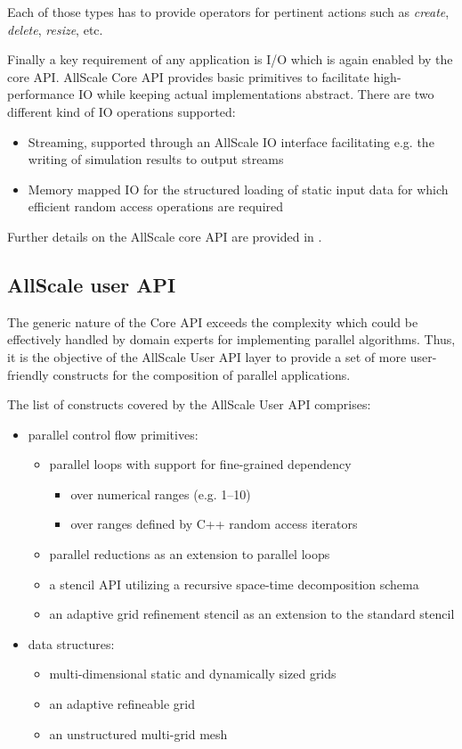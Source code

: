 \documentclass[conference,compsoc]{IEEEtran}
\begin{document}
Each of those types has to provide operators for pertinent actions such as \textit{create}, \textit{delete}, \textit{resize}, etc.

Finally a key requirement of any application is I/O which is again enabled by the core API. AllScale Core API provides basic primitives
to facilitate high-performance IO while keeping actual implementations abstract.
There are two different kind of IO operations supported:
\begin{itemize}
\item Streaming, supported through an AllScale IO interface facilitating e.g. the writing of simulation results to output streams
\item Memory mapped IO for the structured loading of static input data for which efficient random access operations are required
\end{itemize}

Further details on the AllScale core API are provided in \cite{allscale_architecure_2017}.

\subsection{AllScale user API}

The generic nature of the Core API exceeds the complexity which could be
effectively handled by domain experts for implementing parallel algorithms.
Thus, it is the objective of the AllScale User API layer to provide a set of more
user-friendly constructs for the composition of parallel applications.

The list of constructs covered by the AllScale User API comprises:
\begin{itemize}
  \item parallel control flow primitives:
  \begin{itemize}
    \item parallel loops with support for fine-grained dependency
    \begin{itemize}
       \item  over numerical ranges (e.g. 1--10)
       \item  over ranges defined by C++ random access iterators
    \end{itemize}
    \item parallel reductions as an extension to parallel loops
    \item a stencil API utilizing a recursive space-time decomposition schema
    \item an adaptive grid refinement stencil as an extension to the standard stencil
  \end{itemize}
  \item data structures:
  \begin{itemize}
  \item  multi-dimensional static and dynamically sized grids
  \item  an adaptive refineable grid 
  \item  an unstructured multi-grid mesh 
  \end{itemize}
\end{itemize}
\end{document}
